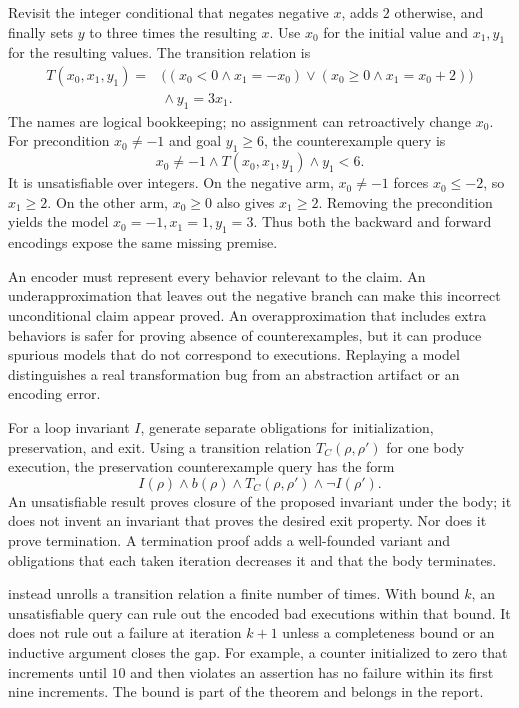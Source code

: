 Revisit the integer conditional that negates negative $x$, adds $2$ otherwise, and finally sets $y$ to three times the resulting $x$.
Use $x_0$ for the initial value and $x_1,y_1$ for the resulting values.
The transition relation is
\[
\begin{split}
 T(x_0,x_1,y_1)={}&
 \bigl((x_0<0\land x_1=-x_0)\lor
       (x_0\geq0\land x_1=x_0+2)\bigr)\\
 &{}\land y_1=3x_1.
\end{split}
\]
The names are logical bookkeeping; no assignment can retroactively change $x_0$.
For precondition $x_0\neq-1$ and goal $y_1\geq6$, the counterexample query is
\[
  x_0\neq-1\land T(x_0,x_1,y_1)\land y_1<6.
\]
It is unsatisfiable over integers.
On the negative arm, $x_0\neq-1$ forces $x_0\leq-2$, so $x_1\geq2$.
On the other arm, $x_0\geq0$ also gives $x_1\geq2$.
Removing the precondition yields the model $x_0=-1,x_1=1,y_1=3$.
Thus both the backward and forward encodings expose the same missing premise.

An encoder must represent every behavior relevant to the claim.
An underapproximation that leaves out the negative branch can make this incorrect unconditional claim appear proved.
An overapproximation that includes extra behaviors is safer for proving absence of counterexamples, but it can produce spurious models that do not correspond to executions.
Replaying a model distinguishes a real transformation bug from an abstraction artifact or an encoding error.

For a loop invariant $I$, generate separate obligations for initialization, preservation, and exit.
Using a transition relation $T_C(\rho,\rho')$ for one body execution, the preservation counterexample query has the form
\[
  I(\rho)\land b(\rho)\land T_C(\rho,\rho')\land\neg I(\rho').
\]
An unsatisfiable result proves closure of the proposed invariant under the body; it does not invent an invariant that proves the desired exit property.
Nor does it prove termination.
A termination proof adds a well-founded variant and obligations that each taken iteration decreases it and that the body terminates.

 instead unrolls a transition relation a finite number of times.
With bound $k$, an unsatisfiable query can rule out the encoded bad executions within that bound.
It does not rule out a failure at iteration $k+1$ unless a completeness bound or an inductive argument closes the gap.
For example, a counter initialized to zero that increments until $10$ and then violates an assertion has no failure within its first nine increments.
The bound is part of the theorem and belongs in the report.

